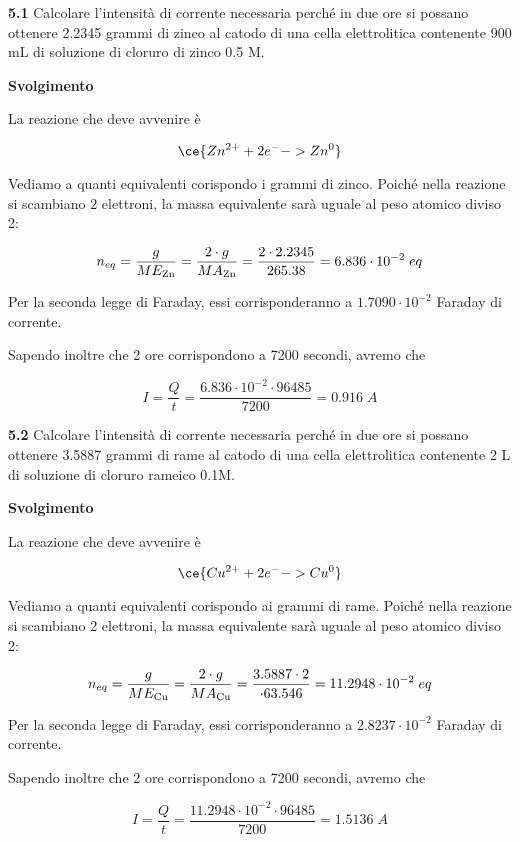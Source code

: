 \textbf{5.1} Calcolare l'intensità di corrente necessaria perché in due ore si possano ottenere 2.2345 grammi di zinco al catodo di una cella elettrolitica contenente 900 mL di soluzione di cloruro di zinco 0.5 M.

\vspace{0.2cm}\large\textbf{Svolgimento}\normalsize

\vspace{0.2cm}La reazione che deve avvenire è

$$\ce{Zn^{2+} + 2e^- -> Zn^{0}}$$

Vediamo a quanti equivalenti corispondo i grammi di zinco. Poiché nella reazione si scambiano 2 elettroni, la massa equivalente sarà uguale al peso atomico diviso 2:

$$n_{eq}=\frac{g}{ME_{\rm Zn}}=\frac{2 \cdot g}{MA_{\rm Zn}}
=\frac{2 \cdot 2.2345}{265.38}
=6.836 \cdot 10^{-2}\;eq$$

Per la seconda legge di Faraday, essi corrisponderanno a $1.7090 \cdot 10^{-2}$ Faraday di corrente.

Sapendo inoltre che 2 ore corrispondono a 7200 secondi, avremo che

$$I=\frac{Q}{t}
=\frac{6.836 \cdot 10^{-2} \cdot 96485}{7200}=0.916\;A$$

\vspace{0.2cm}\textbf{5.2} Calcolare l'intensità di corrente necessaria perché in due ore si possano ottenere 3.5887 grammi di rame al catodo di una cella elettrolitica contenente 2 L di soluzione di cloruro rameico 0.1M.

\vspace{0.2cm}\large\textbf{Svolgimento}\normalsize

\vspace{0.2cm}La reazione che deve avvenire è

$$\ce{Cu^{2+} + 2e^- -> Cu^{0}}$$

Vediamo a quanti equivalenti corispondo ai grammi di rame. Poiché nella reazione si scambiano 2 elettroni, la massa equivalente sarà uguale al peso atomico diviso 2:

$$n_{eq}=\frac{g}{ME_{\rm Cu}}=\frac{2 \cdot g}{MA_{\rm Cu}}
=\frac{3.5887 \cdot 2}{\cdot 63.546}
=11.2948 \cdot 10^{-2}\;eq$$

Per la seconda legge di Faraday, essi corrisponderanno a $2.8237 \cdot 10^{-2}$ Faraday di corrente.

Sapendo inoltre che 2 ore corrispondono a 7200 secondi, avremo che

$$I=\frac{Q}{t}
=\frac{11.2948 \cdot 10^{-2} \cdot 96485}{7200}=1.5136\;A$$

